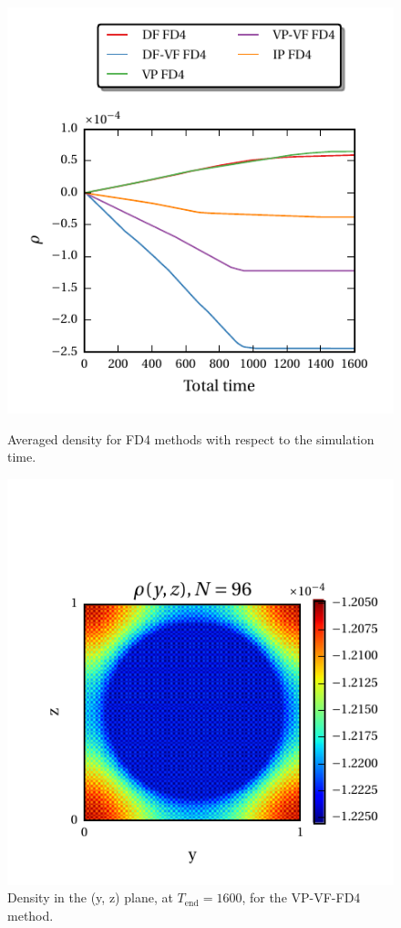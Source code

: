 \begin{figure}[!bp]
  \begin{minipage}[c]{0.45\textwidth}
      \includegraphics{gfx/immersed_boundary/hpflow/long/ts.pdf}
      \caption{\label{hpflow:results_long_ts}
            Averaged density for FD4 methods with respect to the simulation time.
          }
  \end{minipage}
  \hfill
  \begin{minipage}[c]{0.45\textwidth}
      \includegraphics{gfx/immersed_boundary/hpflow/long/example.pdf}
      \caption{\label{hpflow:results_long_example}
        Density in the (y, z) plane, at $T_{\text{end}}=1600$, for the VP-VF-FD4 method.
      }
  \end{minipage}
\end{figure}

